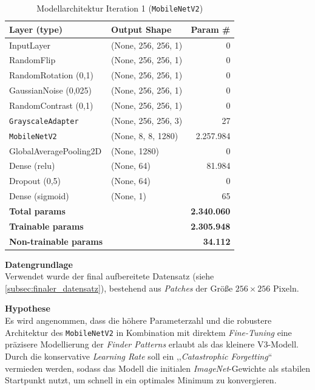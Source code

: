 \documentclass[
    a4paper,        %
    11pt,           %
    ngerman,        %
    parskip=half,   %
    listof=totoc,   %
    bibliography=totoc %
]{scrartcl}
\begin{document}
\begin{table}[H]
    \centering
    \caption{Modellarchitektur Iteration 1 (\texttt{MobileNetV2})}
    \label{tab:mnetv2_model_summary_iter1}
    \begin{tabular}{llr}
        \toprule
        \textbf{Layer (type)} & \textbf{Output Shape} & \textbf{Param \#} \\
        \midrule
        InputLayer & (None, 256, 256, 1) & 0 \\
        RandomFlip & (None, 256, 256, 1) & 0 \\
        RandomRotation (0,1) & (None, 256, 256, 1) & 0 \\
        GaussianNoise (0,025) & (None, 256, 256, 1) & 0 \\
        RandomContrast (0,1) & (None, 256, 256, 1) & 0 \\
        \texttt{GrayscaleAdapter} & (None, 256, 256, 3) & 27 \\
        \texttt{MobileNetV2} & (None, 8, 8, 1280) & 2.257.984 \\
        GlobalAveragePooling2D & (None, 1280) & 0 \\
        Dense (relu) & (None, 64) & 81.984 \\
        Dropout (0,5) & (None, 64) & 0 \\
        Dense (sigmoid) & (None, 1) & 65 \\
        \midrule
        \textbf{Total params} & & \textbf{2.340.060} \\
        \textbf{Trainable params} & & \textbf{2.305.948} \\
        \textbf{Non-trainable params} & & \textbf{34.112} \\
        \bottomrule
    \end{tabular}
\end{table}

\textbf{Datengrundlage} \\
Verwendet wurde der final aufbereitete Datensatz (siehe \autoref{subsec:finaler_datensatz}), bestehend aus \textit{Patches} der Größe $256 \times 256$ Pixeln.

\textbf{Hypothese} \\
Es wird angenommen, dass die höhere Parameterzahl und die robustere Architektur des \texttt{MobileNetV2} in Kombination mit direktem \textit{Fine-Tuning} eine präzisere Modellierung der \textit{Finder Patterns} erlaubt als das kleinere V3-Modell. Durch die konservative \textit{Learning Rate} soll ein ,,\textit{Catastrophic Forgetting}`` vermieden werden, sodass das Modell die initialen \textit{ImageNet}-Gewichte als stabilen Startpunkt nutzt, um schnell in ein optimales Minimum zu konvergieren.
\end{document}
